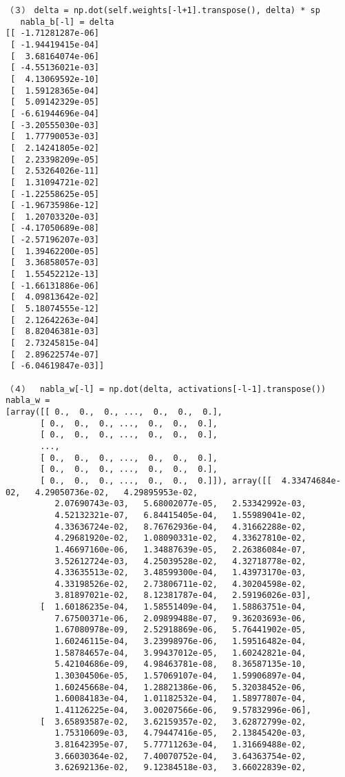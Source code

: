\documentclass[11pt,a4j,fleqn]{jarticle}
\begin{document}
\begin{verbatim}
（３）　delta = np.dot(self.weights[-l+1].transpose(), delta) * sp
   nabla_b[-l] = delta
[[ -1.71281287e-06]
 [ -1.94419415e-04]
 [  3.68164074e-06]
 [ -4.55136021e-03]
 [  4.13069592e-10]
 [  1.59128365e-04]
 [  5.09142329e-05]
 [ -6.61944696e-04]
 [ -3.20555030e-03]
 [  1.77790053e-03]
 [  2.14241805e-02]
 [  2.23398209e-05]
 [  2.53264026e-11]
 [  1.31094721e-02]
 [ -1.22558625e-05]
 [ -1.96735986e-12]
 [  1.20703320e-03]
 [ -4.17050689e-08]
 [ -2.57196207e-03]
 [  1.39462200e-05]
 [  3.36858057e-03]
 [  1.55452212e-13]
 [ -1.66131886e-06]
 [  4.09813642e-02]
 [  5.18074555e-12]
 [  2.12642263e-04]
 [  8.82046381e-03]
 [  2.73245815e-04]
 [  2.89622574e-07]
 [ -6.04619847e-03]]

（４）  nabla_w[-l] = np.dot(delta, activations[-l-1].transpose())
nabla_w =
[array([[ 0.,  0.,  0., ...,  0.,  0.,  0.],
       [ 0.,  0.,  0., ...,  0.,  0.,  0.],
       [ 0.,  0.,  0., ...,  0.,  0.,  0.],
       ..., 
       [ 0.,  0.,  0., ...,  0.,  0.,  0.],
       [ 0.,  0.,  0., ...,  0.,  0.,  0.],
       [ 0.,  0.,  0., ...,  0.,  0.,  0.]]), array([[  4.33474684e-02,   4.29050736e-02,   4.29895953e-02,
          2.07690743e-03,   5.68002077e-05,   2.53342992e-03,
          4.52132321e-07,   6.84415405e-04,   1.55989041e-02,
          4.33636724e-02,   8.76762936e-04,   4.31662288e-02,
          4.29681920e-02,   1.08090331e-02,   4.33627810e-02,
          1.46697160e-06,   1.34887639e-05,   2.26386084e-07,
          3.52612724e-03,   4.25039528e-02,   4.32718778e-02,
          4.33635513e-02,   3.48599300e-04,   1.43973170e-03,
          4.33198526e-02,   2.73806711e-02,   4.30204598e-02,
          3.81897021e-02,   8.12381787e-04,   2.59196026e-03],
       [  1.60186235e-04,   1.58551409e-04,   1.58863751e-04,
          7.67500371e-06,   2.09899488e-07,   9.36203693e-06,
          1.67080978e-09,   2.52918869e-06,   5.76441902e-05,
          1.60246115e-04,   3.23998976e-06,   1.59516482e-04,
          1.58784657e-04,   3.99437012e-05,   1.60242821e-04,
          5.42104686e-09,   4.98463781e-08,   8.36587135e-10,
          1.30304506e-05,   1.57069107e-04,   1.59906897e-04,
          1.60245668e-04,   1.28821386e-06,   5.32038452e-06,
          1.60084183e-04,   1.01182532e-04,   1.58977807e-04,
          1.41126225e-04,   3.00207566e-06,   9.57832996e-06],
       [  3.65893587e-02,   3.62159357e-02,   3.62872799e-02,
          1.75310609e-03,   4.79447416e-05,   2.13845420e-03,
          3.81642395e-07,   5.77711263e-04,   1.31669488e-02,
          3.66030364e-02,   7.40070752e-04,   3.64363754e-02,
          3.62692136e-02,   9.12384518e-03,   3.66022839e-02,

\end{verbatim}
\end{document}
